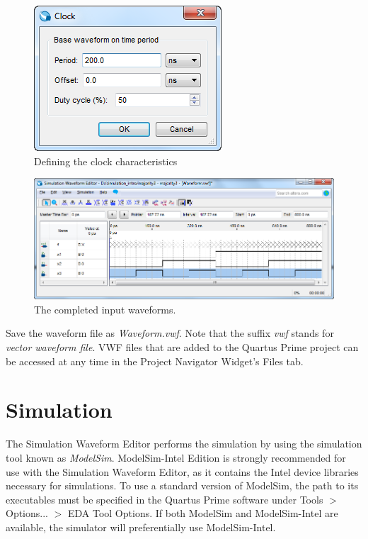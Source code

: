 \documentclass[11pt, twoside, pdftex]{article}
\begin{document}
\begin{figure}[H]
   \begin{center}
      \includegraphics[scale=0.7]{figures/figure15.png}
   \caption{Defining the clock characteristics} 
	 \label{fig:15}
	 \end{center}
\end{figure}

\begin{figure}[H]
   \begin{center}
      \includegraphics[scale=0.65]{figures/figure16.png}
   \caption{The completed input waveforms.} 
	 \label{fig:16}
	 \end{center}
\end{figure}

Save the waveform file as {\it Waveform.vwf}.
Note that the suffix {\it vwf} stands for {\it vector waveform file}. VWF files that are 
added to the Quartus Prime project can be accessed at any time in the
Project Navigator Widget's Files tab.

\section{Simulation}

The Simulation Waveform Editor performs the simulation by using the simulation tool known as
{\it ModelSim}.  ModelSim-Intel Edition is strongly recommended for use with the Simulation 
Waveform Editor, as it contains the Intel device libraries necessary for simulations. To 
use a standard version of ModelSim, the path to its executables must be specified in the
Quartus Prime software under {\sf Tools $>$ Options... $>$ EDA Tool Options}. If both ModelSim and 
ModelSim-Intel are available, the simulator will preferentially use ModelSim-Intel.
\end{document}
